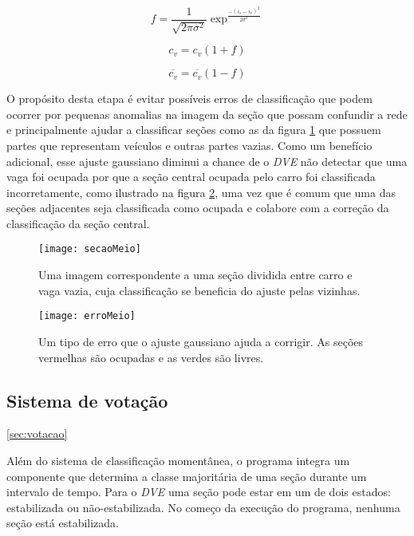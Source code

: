 \begin{equation}
	f = \frac{1}{\sqrt{2\pi\sigma^2}} \exp^{\frac{-(i_s-i_v)^2}{2\sigma^2}} 
\label{eq:gaussiana}
\end{equation}

\begin{equation}
	c_v  = c_v(1+f)
\label{eq:novoCv}
\end{equation}

\begin{equation}
	\overline{c_v}  = \overline{c_v}(1-f)
\label{eq:novoRCv}
\end{equation}

O propósito desta etapa é evitar possíveis erros de classificação que podem ocorrer por pequenas anomalias na imagem da seção que possam confundir a rede e principalmente ajudar a classificar seções como as da figura \ref{fig:secaoMeio} que possuem partes que representam veículos e outras partes vazias. Como um benefício adicional, esse ajuste gaussiano diminui a chance de o \textit{DVE} não detectar que uma vaga foi ocupada por que a seção central ocupada pelo carro foi classificada incorretamente, como ilustrado na figura \ref{fig:erromeio}, uma vez que é comum que uma das seções adjacentes seja classificada como ocupada e colabore com a correção da classificação da seção central.


\begin{figure}
	\centering
	\texttt{[image: secaoMeio]}
	\label{fig:secaoMeio}
	\caption{Uma imagem correspondente a uma seção dividida entre carro e vaga vazia, cuja classificação se beneficia do ajuste pelas vizinhas.}
	\centering
\end{figure}

\begin{figure}
	\centering
	\texttt{[image: erroMeio]}
	\label{fig:erromeio}
	\caption{Um tipo de erro que o ajuste gaussiano ajuda a corrigir. As seções vermelhas são ocupadas e as verdes são livres.}
	\centering
\end{figure}

\subsection{Sistema de votação}\ref{sec:votacao}

Além do sistema de classificação momentânea, o programa integra um componente que determina a classe majoritária de uma seção durante um intervalo de tempo. Para o \textit{DVE} uma seção pode estar em um de dois estados: estabilizada ou não-estabilizada. No começo da execução do programa, nenhuma seção está estabilizada. 

